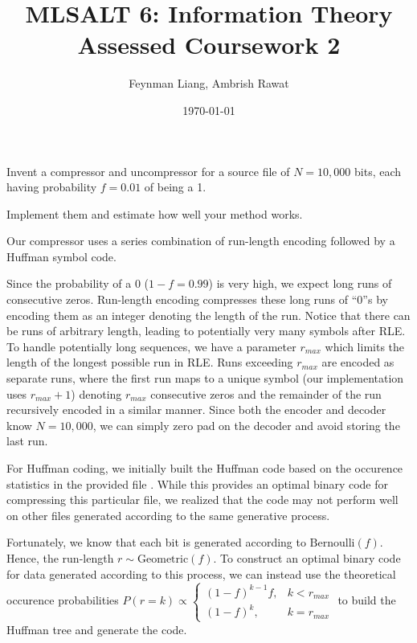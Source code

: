 \documentclass[a4paper,oneside,reqno]{hmcpset}
\newcommand{\authorname}{Feynman Liang, Ambrish Rawat}
\newcommand{\coursename}{MLSALT 6: Information Theory}
\newcommand{\assignmentname}{Assessed Coursework 2}
\begin{document}
\title{\coursename\\\assignmentname}
\author{\authorname}
\date{\today}


\begin{problem}
  Invent a compressor and uncompressor for a source file of $N=10,000$ bits,
  each having probability $f = 0.01$ of being a 1.

  Implement them and estimate how well your method works.
\end{problem}

\begin{solution}
  Our compressor uses a series combination of run-length encoding followed by a
  Huffman symbol code.

  Since the probability of a $0$ ($1-f = 0.99$) is very high, we expect long
  runs of consecutive zeros. Run-length encoding compresses these long runs of
  ``0''s by encoding them as an integer denoting the length of the run. Notice
  that there can be runs of arbitrary length, leading to potentially very many
  symbols after RLE. To handle potentially long sequences, we have a parameter
  $r_{max}$ which limits the length of the longest possible run in RLE. Runs
  exceeding $r_{max}$ are encoded as separate runs, where the first run
  maps to a unique symbol (our implementation uses $r_{max} +1$) denoting
  $r_{max}$ consecutive zeros and the remainder of the run recursively encoded
  in a similar manner. Since both the encoder and decoder know $N=10,000$, we
  can simply zero pad on the decoder and avoid storing the last run.

  For Huffman coding, we initially built the Huffman code based on the
  occurence statistics in the provided file .
  While this provides an optimal binary code for compressing this particular file,
  we realized that the code may not perform well on other files generated
  according to the same generative process.

  Fortunately, we know that each bit is generated according to
  $\text{Bernoulli}(f)$. Hence, the run-length $r \sim \text{Geometric}(f)$.
  To construct an optimal binary code for data generated according to this
  process, we can instead use the theoretical occurence probabilities $P(r = k) \propto \begin{cases}
    (1-f)^{k-1}f, &k < r_{max}\\
    (1-f)^{k}, &k = r_{max}
  \end{cases}$ to build the Huffman tree and generate the code.


\end{solution}
\end{document}
